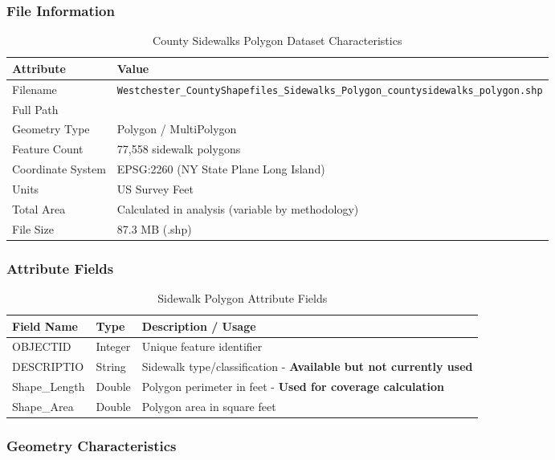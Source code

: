 \documentclass[11pt,letterpaper]{article}
\begin{document}
\subsubsection{File Information}
\begin{table}[H]
\centering
\begin{tabular}{ll}
\toprule
\textbf{Attribute} & \textbf{Value} \\
\midrule
Filename & \texttt{Westchester\_CountyShapefiles\_Sidewalks\_Polygon\_countysidewalks\_polygon.shp} \\
Full Path & \texttt{} \\
Geometry Type & Polygon / MultiPolygon \\
Feature Count & 77,558 sidewalk polygons \\
Coordinate System & EPSG:2260 (NY State Plane Long Island) \\
Units & US Survey Feet \\
Total Area & Calculated in analysis (variable by methodology) \\
File Size & 87.3 MB (.shp) \\
\bottomrule
\end{tabular}
\caption{County Sidewalks Polygon Dataset Characteristics}
\label{tab:sidewalks}
\end{table}

\subsubsection{Attribute Fields}

\begin{table}[H]
\centering
\begin{tabular}{llp{6cm}}
\toprule
\textbf{Field Name} & \textbf{Type} & \textbf{Description / Usage} \\
\midrule
OBJECTID & Integer & Unique feature identifier \\
DESCRIPTIO & String & Sidewalk type/classification - \textbf{Available but not currently used} \\
Shape\_Length & Double & Polygon perimeter in feet - \textbf{Used for coverage calculation} \\
Shape\_Area & Double & Polygon area in square feet \\
\bottomrule
\end{tabular}
\caption{Sidewalk Polygon Attribute Fields}
\label{tab:sidewalks_attr}
\end{table}

\subsubsection{Geometry Characteristics}
\end{document}
